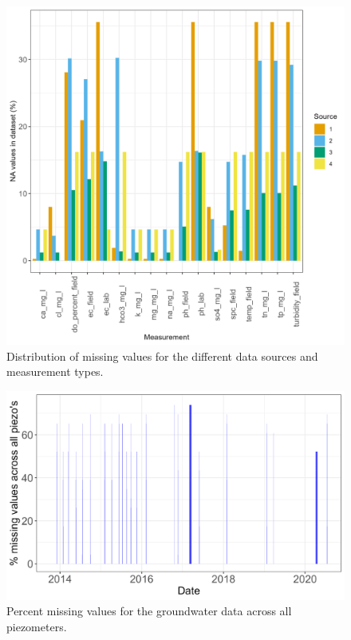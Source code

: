 \documentclass[, manuscript]{copernicus}
\begin{document}
\begin{figure}
\includegraphics[width=0.9\linewidth]{Figures/na_count} \caption{Distribution of missing values for the different data sources and measurement types.}\label{fig:na-plot}
\end{figure}

\clearpage

\begin{figure}
\includegraphics[width=0.9\linewidth]{Figures/na_GW} \caption{Percent missing values for the groundwater data across all piezometers.}\label{fig:gw-na-plot}
\end{figure}
\end{document}
